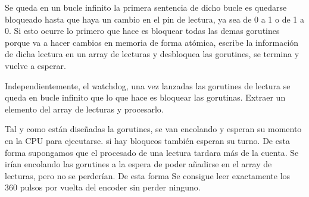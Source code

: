Se queda en un bucle infinito la primera sentencia de dicho bucle es quedarse bloqueado hasta que haya un cambio en el pin de lectura, ya sea de 0 a 1 o de 1 a 0.
Si esto ocurre lo primero que hace es bloquear todas las demas gorutines porque va a hacer cambios en memoria de forma atómica, escribe la información de dicha lectura en un array de lecturas y desbloquea las gorutines, se termina y vuelve a esperar.

Independientemente, el watchdog, una vez lanzadas las gorutines de lectura se queda en bucle infinito que lo que hace es bloquear las gorutinas.
Extraer un elemento del array de lecturas y procesarlo.

Tal y como están diseñadas la gorutines, se van encolando y esperan su momento en la CPU para ejecutarse.
si hay bloqueos también esperan su turno.
De esta forma supongamos que el procesado de una lectura tardara más de la cuenta.
Se irían encolando las gorutines a la espera de poder añadirse en el array de lecturas, pero no se perderían.
De esta forma Se consigue leer exactamente los 360 pulsos por vuelta del encoder sin perder ninguno.


